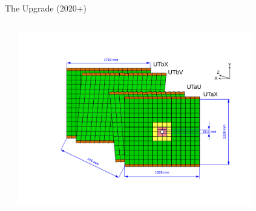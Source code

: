 \documentclass[aspectratio=1610]{beamer}
\begin{document}
\begin{frame}{The \lhcb Upgrade (2020+)}
\begin{columns}
\begin{column}{0.6\textwidth}

\end{column}
\begin{column}{0.4\textwidth}
\centering
\vspace{-1cm}
\includegraphics[width=0.8\textwidth]{figs/detector/UT.pdf}
\end{column}

\end{columns}

\end{frame}
\end{document}
